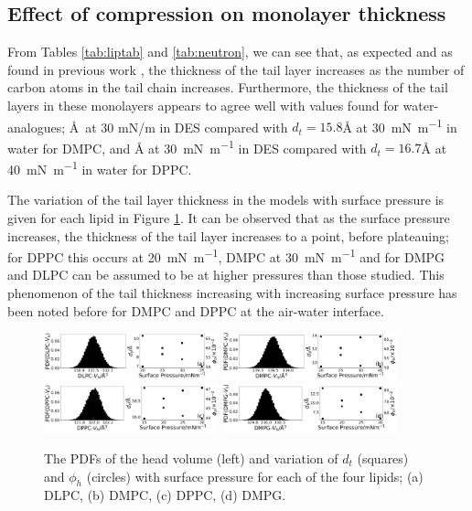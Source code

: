\documentclass[amsmath,amssymb,twocolumn,superscriptaddress]{revtex4-1}
\begin{document}
\subsection{Effect of compression on monolayer thickness}
%
From Tables \ref{tab:liptab} and \ref{tab:neutron}, we can see that, as expected and as found in previous work \cite{Mohwald1990,Vaknin1991}, the thickness of the tail layer increases as the number of carbon atoms in the tail chain increases.
Furthermore, the thickness of the tail layers in these monolayers appears to agree well with values found for water-analogues; \AA\ at 30 mN/m in DES compared with $d_t=15.8$\si{\angstrom} at \SI{30}{\milli\newton\per\meter} \cite{Johnson1991} in water for DMPC, and \si{\angstrom} at \SI{30}{\milli\newton\per\meter} in DES compared with $d_t=16.7$\si{\angstrom} at \SI{40}{\milli\newton\per\meter} \cite{Helm1987} in water for DPPC.

The variation of the tail layer thickness in the models with surface pressure is given for each lipid in Figure \ref{fig:lipresults}.
It can be observed that as the surface pressure increases, the thickness of the tail layer increases to a point, before plateauing; for DPPC this occurs at \SI{20}{\milli\newton\per\meter}, DMPC at \SI{30}{\milli\newton\per\meter} and for DMPG and DLPC can be assumed to be at higher pressures than those studied.
This phenomenon of the tail thickness increasing with increasing surface pressure has been noted before for DMPC \cite{Bayerl1990} and DPPC \cite{Campbell2018} at the air-water interface.
%
\begin{figure}
	\centering
  \includegraphics[width=0.45\textwidth]{figures/dlpc_vh_dt_phi}
	\includegraphics[width=0.45\textwidth]{figures/dmpc_vh_dt_phi}
	\includegraphics[width=0.45\textwidth]{figures/dppc_vh_dt_phi}
	\includegraphics[width=0.45\textwidth]{figures/dmpg_vh_dt_phi}
	\caption{\small The PDFs of the head volume (left) and variation of
  $d_t$ (squares) and $\phi_h$ (circles) with surface pressure for each of
  the four lipids; (a) DLPC, (b) DMPC, (c) DPPC, (d) DMPG.}
	\label{fig:lipresults}
\end{figure}
%
\end{document}
